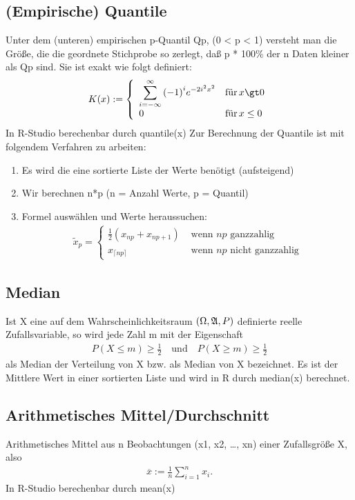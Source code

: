 \documentclass[a4paper,10pt]{scrartcl}
\begin{document}
\subsection{(Empirische) Quantile}
Unter dem (unteren) empirischen p-Quantil Qp, (0 < p < 1) versteht man die Größe, die die geordnete Stichprobe so zerlegt, daß p * 100\% der n Daten kleiner als Qp sind. Sie ist exakt wie folgt definiert:
\begin{eqnarray*}K(x):=\left\{\begin{array}{ll}\displaystyle \sum _{i=-\infty }^{\infty }{(-1)}^{i}{e}^{-2{i}^{2}{x}^{2}} & {\text{f}\rm{\ddot{u}}\text{r}}\,x\gt 0\\ 0 & {\text{f}\rm{\ddot{u}}\text{r}}\,x\le 0\end{array}\right.\end{eqnarray*}
In R-Studio berechenbar durch quantile(x)
Zur Berechnung der Quantile ist mit folgendem Verfahren zu arbeiten:
\begin{enumerate}
    \item Es wird die eine sortierte Liste der Werte benötigt (aufsteigend)
    \item Wir berechnen n*p (n = Anzahl Werte, p = Quantil)
    \item Formel auswählen und Werte heraussuchen:
    \begin{align*}\tilde{x}_p=\begin{cases} \frac{1}{2}(x_{np}+x_{np+1}) & \text{ wenn }np\text{ ganzzahlig}\\ x_{\lceil np \rceil}& \text{ wenn }np\text{ nicht ganzzahlig}\end{cases}
\end{align*}

\end{enumerate}
\subsection{Median}
Ist X eine auf dem Wahrscheinlichkeitsraum $({\rm{\Omega }},{\mathfrak{A}},P)$ definierte reelle Zufallsvariable, so wird jede Zahl m mit der Eigenschaft 
\begin{eqnarray*}P(X\le m)\ge \frac{1}{2}\quad \text{und}\quad P(X\ge m)\ge \frac{1}{2}\end{eqnarray*}
als Median der Verteilung von X bzw. als Median von X bezeichnet. Es ist der Mittlere Wert in einer sortierten Liste und wird in R durch median(x) berechnet.
\subsection{Arithmetisches Mittel/Durchschnitt}
Arithmetisches Mittel aus n Beobachtungen (x1, x2, …, xn) einer Zufallsgröße X, also \begin{eqnarray*}\overline{x}:=\frac{1}{n}\displaystyle \sum _{i=1}^{n}{x}_{i}.\end{eqnarray*}
In R-Studio berechenbar durch mean(x)
\end{document}

